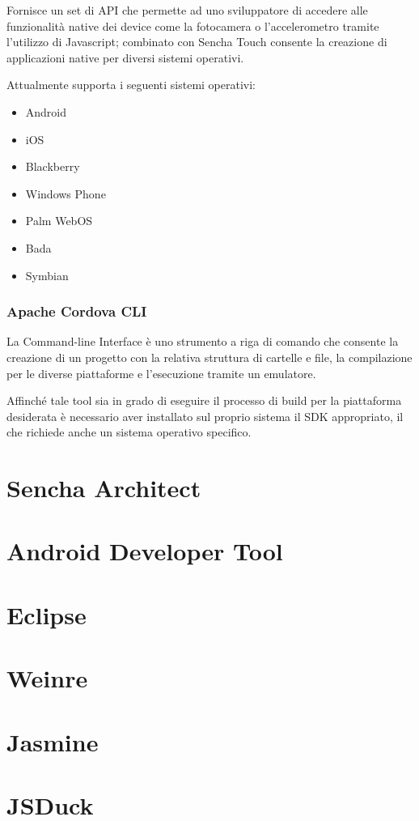 Fornisce un set di \ac{API} che permette ad uno sviluppatore di accedere alle funzionalità native dei device come la fotocamera o l'accelerometro tramite l'utilizzo di Javascript; combinato con Sencha Touch consente la creazione di applicazioni native per diversi sistemi operativi.

Attualmente supporta i seguenti sistemi operativi:
\begin{itemize}
\item Android
\item iOS
\item Blackberry
\item Windows Phone
\item Palm WebOS
\item Bada
\item Symbian
\end{itemize}

\subsubsection{Apache Cordova CLI}
La Command-line Interface è uno strumento a riga di comando che consente la creazione di un progetto con la relativa struttura di cartelle e file, la compilazione per le diverse piattaforme e l'esecuzione tramite un emulatore.

Affinché tale tool sia in grado di eseguire il processo di build per la piattaforma desiderata è necessario aver installato sul proprio sistema il \ac{SDK} appropriato, il che richiede anche un sistema operativo specifico.

\section{Sencha Architect}

\section{Android Developer Tool}

\section{Eclipse}

\section{Weinre}

\section{Jasmine}

\section{JSDuck}